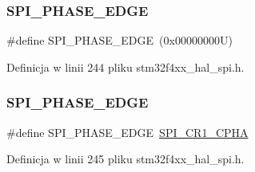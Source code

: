 \subsubsection{\texorpdfstring{S\+P\+I\+\_\+\+P\+H\+A\+S\+E\+\_\+E\+D\+GE}{SPI\_PHASE\_1EDGE}}
{\footnotesize\ttfamily \#define S\+P\+I\+\_\+\+P\+H\+A\+S\+E\+\_\+E\+D\+GE~(0x00000000\+U)}



Definicja w linii 244 pliku stm32f4xx\+\_\+hal\+\_\+spi.\+h.

\mbox{\label{group___s_p_i___clock___phase_ga960275ac1d01d302c48e713399990c36}} 
\subsubsection{\texorpdfstring{S\+P\+I\+\_\+\+P\+H\+A\+S\+E\+\_\+E\+D\+GE}{SPI\_PHASE\_2EDGE}}
{\footnotesize\ttfamily \#define S\+P\+I\+\_\+\+P\+H\+A\+S\+E\+\_\+E\+D\+GE~\hyperlink{group___peripheral___registers___bits___definition_ga97602d8ded14bbd2c1deadaf308755a3}{S\+P\+I\+\_\+\+C\+R1\+\_\+\+C\+P\+HA}}



Definicja w linii 245 pliku stm32f4xx\+\_\+hal\+\_\+spi.\+h.

